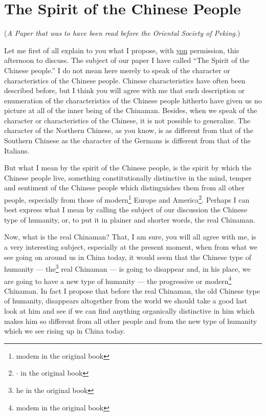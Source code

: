\chapter{The Spirit of the Chinese People}
\begin{center} \footnotesize
    (\emph{A Paper that was to have been read before the Oriental Society of Peking.})
\end{center}

Let me first of all explain to you what I propose, with \underline{you} permission, this afternoon to discuss.
The subject of our paper I have called ``The Spirit of the Chinese people.''
I do not mean here merely to speak of the character or characteristics of the Chinese people.
Chinese characteristics have often been described before, but I think you will agree with me that such description or enumeration of the characteristics of the Chinese people hitherto have given us no picture at all of the inner being of the Chinaman.
Besides, when we speak of the character or characteristics of the Chinese, it is not possible to generalize.
The character of the Northern Chinese, as you know, is as different from that of the Southern Chinese as the character of the Germans is different from that of the Italians.

But what I mean by the spirit of the Chinese people, is the spirit by which the Chinese people live, something constitutionally distinctive in the mind, temper and sentiment of the Chinese people which distinguishes them from all other people, especially from those of modern\footnote{modem in the original book} Europe and America\footnote{{\huge$\cdot$} in the original book}.
Perhaps I can best express what I mean by calling the subject of our discussion the Chinese type of humanity, or, to put it in plainer and shorter words, the real Chinaman.

Now, what is the real Chinaman? 
That, I am sure, you will all agree with me, is a very interesting subject, especially at the present moment, when from what we see going on around us in China today, it would seem that the Chinese type of humanity --- the\footnote{he in the original book} real Chinaman --- is going to disappear and, in his place, we are going to have a new type of humanity --- the progressive or modern\footnote{modem in the original book} Chinaman.
In fact I propose that before the real Chinaman, the old Chinese type of humanity, disappears altogether from the world we should take a good last look at him and see if we can find anything organically distinctive in him which makes him so different from all other people and from the new type of humanity which we see rising up in China today.

